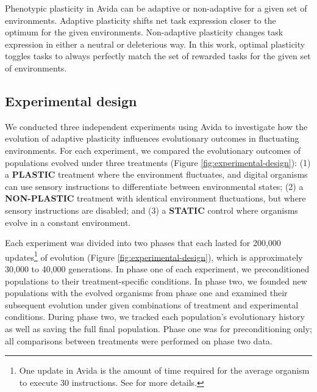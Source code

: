 Phenotypic plasticity in Avida can be adaptive or non-adaptive for a given set of environments.
Adaptive plasticity shifts net task expression closer to the optimum for the given environments.
Non-adaptive plasticity changes task expression in either a neutral or deleterious way. 
In this work, optimal plasticity toggles tasks to always perfectly match the set of rewarded tasks for the given set of environments.

\subsection{Experimental design}
\label{sec:methods:experiment}




We conducted three independent experiments using Avida to investigate how the evolution of adaptive plasticity influences evolutionary outcomes in fluctuating environments.
For each experiment, we compared the evolutionary outcomes of populations evolved under three treatments (Figure \ref{fig:experimental-design}): 
(1) a \textbf{PLASTIC} treatment where the environment fluctuates, and digital organisms can use sensory instructions to differentiate between environmental states;
(2) a \textbf{NON-PLASTIC} treatment with identical environment fluctuations, but where sensory instructions are disabled;
and (3) a \textbf{STATIC} control where organisms evolve in a constant environment.

Each experiment was divided into two phases that each lasted for 200,000 updates\footnote{
    One update in Avida is the amount of time required for the average organism to execute 30 instructions. 
    See \citep{ofria_avida:_2009} for more details.
} of evolution (Figure \ref{fig:experimental-design}), which is approximately 30,000 to 40,000 generations.
In phase one of each experiment, we preconditioned populations to their treatment-specific conditions.
In phase two, we founded new populations with the evolved organisms from phase one and examined their subsequent evolution under given combinations of treatment and experimental conditions.
During phase two, we tracked each population's evolutionary history as well as saving the full final population.
Phase one was for preconditioning only; all comparisons between treatments were performed on phase two data.

